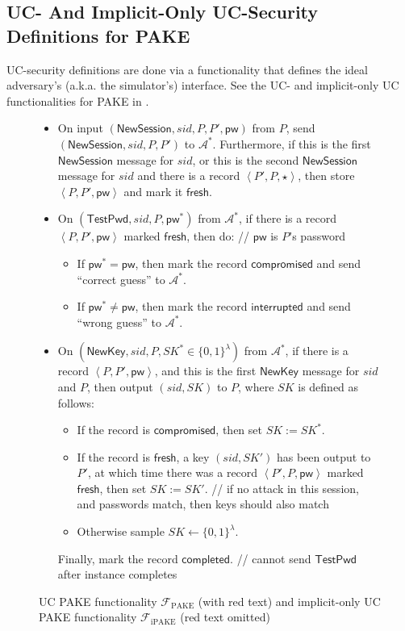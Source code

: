 \documentclass{article}
\newcommand{\adv}{\mathcal{A}}
\newcommand{\func}{\mathcal{F}}
\newcommand{\Fpake}{\func_\mathrm{PAKE}}
\newcommand{\Fipake}{\func_\mathrm{iPAKE}}
\newcommand{\pw}{\mathsf{pw}}
\newcommand{\NewSession}{\mathsf{NewSession}}
\newcommand{\TestPwd}{\mathsf{TestPwd}}
\newcommand{\NewKey}{\mathsf{NewKey}}
\newcommand{\fresh}{\mathsf{fresh}}
\newcommand{\compromised}{\mathsf{compromised}}
\newcommand{\interrupted}{\mathsf{interrupted}}
\newcommand{\completed}{\mathsf{completed}}
\begin{document}
\subsection{UC- And Implicit-Only UC-Security Definitions for PAKE}
\label{sec:UC}
UC-security definitions are done via a functionality that defines the ideal adversary's (a.k.a. the simulator's) interface. See the UC- and implicit-only UC functionalities for PAKE in .
\begin{figure}[H]
\begin{framed}
\begin{small}
\begin{itemize}
  \item On input $(\NewSession, sid, P, P', \pw)$ from $P$, send $(\NewSession, sid, P, P')$ to $\adv^*$. Furthermore, if this is the first $\NewSession$ message for $sid$, or this is the second $\NewSession$ message for $sid$ and there is a record $\left<P',P,\star\right>$, then store $\left<P,P',\pw\right>$ and mark it $\fresh$.
  \item On $(\TestPwd, sid, P, \pw^*)$ from $\adv^*$, if there is a record $\left<P,P',\pw\right>$ marked $\fresh$, then do: \quad \textcolor[gray]{0.5}{// $\pw$ is $P$'s password}
      \begin{itemize}
        \item If $\pw^* = \pw$, then mark the record $\compromised$ {\color{red}and send ``correct guess'' to $\adv^*$}.
        \item If $\pw^* \neq \pw$, then mark the record $\interrupted$ {\color{red}and send ``wrong guess'' to $\adv^*$}.
      \end{itemize}
        \item On $(\NewKey, sid, P, SK^* \in \{0,1\}^\lambda)$ from $\adv^*$, if there is a record $\left<P,P',\pw\right>$, and this is the first $\NewKey$ message for $sid$ and $P$, then output $(sid, SK)$ to $P$, where $SK$ is defined as follows:
            \begin{itemize}
              \item If the record is $\compromised$, then set $SK := SK^*$.
              \item If the record is $\fresh$, a key $(sid, SK')$ has been output to $P'$, at which time there was a record $\left<P',P,\pw\right>$ marked $\fresh$, then set $SK := SK'$. \quad \textcolor[gray]{0.5}{// if no attack in this session, and passwords match, then keys should also match}
              \item Otherwise sample $SK \gets \{0,1\}^\lambda$.
            \end{itemize}
            Finally, mark the record $\completed$. \quad \textcolor[gray]{0.5}{// cannot send $\TestPwd$ after instance completes}
    \end{itemize}
\end{small}
\end{framed}
\caption{UC PAKE functionality $\Fpake$ (with red text) and implicit-only UC PAKE functionality $\Fipake$ (red text omitted)}
\label{fig:pake-func}
\end{figure}
\end{document}
